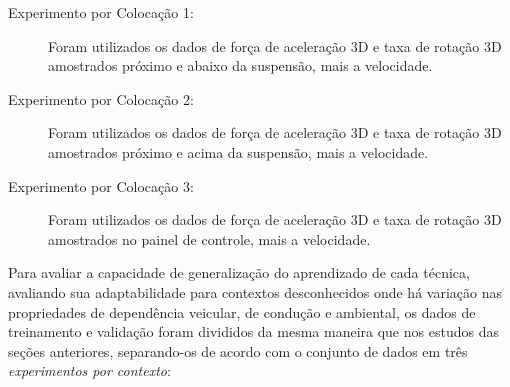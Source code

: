 \begin{description}
	
	\item[Experimento por Colocação 1:] Foram utilizados os dados de força de aceleração 3D e taxa de rotação 3D amostrados próximo e abaixo da suspensão, mais a velocidade.
    
    \item[Experimento por Colocação 2:] Foram utilizados os dados de força de aceleração 3D e taxa de rotação 3D amostrados próximo e acima da suspensão, mais a velocidade.
    
    \item[Experimento por Colocação 3:] Foram utilizados os dados de força de aceleração 3D e taxa de rotação 3D amostrados no painel de controle, mais a velocidade.
    
\end{description}

Para avaliar a capacidade de generalização do aprendizado de cada técnica, avaliando sua adaptabilidade para contextos desconhecidos onde há variação nas propriedades de dependência veicular, de condução e ambiental, os dados de treinamento e validação foram divididos da mesma maneira que nos estudos das seções anteriores, separando-os de acordo com o conjunto de dados em três \emph{experimentos por contexto}:


